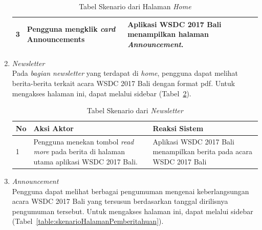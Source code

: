 \begin{enumerate}
\begin{table}[H]
\begin{tabular}{|p{0.5cm}|p{7cm}|p{7cm}|}
				3  & Pengguna mengklik {\it card} Announcements & Aplikasi WSDC 2017 Bali menampilkan halaman \textit{Announcement}. \\ \hline
			\end{tabular}
			\caption{Tabel Skenario dari Halaman \textit{Home}}
			\label{table:skenarioHalamanUtama}
		\end{table}
	\item \textit{Newsletter} \\ 
	Pada \textit{bagian newsletter} yang terdapat di \textit{home}, pengguna dapat melihat berita-berita terkait acara WSDC 2017 Bali dengan format pdf. Untuk mengakses halaman ini, dapat melalui sidebar (Tabel~\ref{table:skenarioBerita}).
		\begin{table}[H]
			\centering
			\begin{tabular}{|p{0.5cm}|p{7cm}|p{7cm}|}
				\hline
				No & Aksi Aktor                               & Reaksi Sistem                                          \\ \hline
				1  & Pengguna menekan tombol {\it read more} pada berita di halaman utama aplikasi WSDC 2017 Bali. & Aplikasi WSDC 2017 Bali menampilkan berita pada acara WSDC 2017 Bali \\ \hline
			\end{tabular}
			\caption{Tabel Skenario dari \textit{Newsletter}}
			\label{table:skenarioBerita}
		\end{table}
	\item \textit{Announcement} \\ 
	Pengguna dapat melihat berbagai pengumuman mengenai keberlangsungan acara WSDC 2017 Bali yang tersusun berdasarkan tanggal dirilisnya pengumuman tersebut. Untuk mengakses halaman ini, dapat melalui sidebar (Tabel~\ref{table:skenarioHalamanPemberitahuan}).

\end{enumerate}
